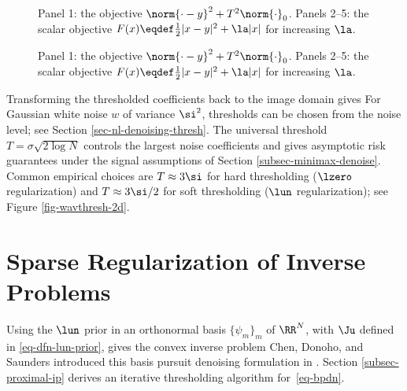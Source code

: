 \begin{figure}[tbp]
\centering
{}\hfill
{}
\caption{Panel 1: the objective $\norm{\cdot-y}^2+T^2 \norm{\cdot}_0$.
    Panels 2--5: the scalar objective $F(x) \eqdef \frac{1}{2}|x-y|^2+\la |x|$ for increasing $\la$.}
\label{fig-varspars}
\end{figure}
\begin{figure}[tbp]
\BookContinuedFigure
\centering
{}\hfill
{}\hfill
{}
\caption{Panel 1: the objective $\norm{\cdot-y}^2+T^2 \norm{\cdot}_0$.
    Panels 2--5: the scalar objective $F(x) \eqdef \frac{1}{2}|x-y|^2+\la |x|$ for increasing $\la$.}
\label{fig-varspars-continued}
\end{figure}




Transforming the thresholded coefficients back to the image domain gives
For Gaussian white noise $w$ of variance $\si^2$, thresholds can be chosen from the noise level; see Section \ref{sec-nl-denoising-thresh}. The universal threshold $T=\sigma\sqrt{2\log N}$ controls the largest noise coefficients and gives asymptotic risk guarantees under the signal assumptions of Section \ref{subsec-minimax-denoise}. Common empirical choices are $T \approx 3\si$ for hard thresholding ($\lzero$ regularization) and $T \approx 3\si/2$ for soft thresholding ($\lun$ regularization); see Figure \ref{fig-wavthresh-2d}.



                                                                                  


                                                                
                                                                
                                                                
\section{Sparse Regularization of Inverse Problems}
\label{sec-sparse-ip}

Using the $\lun$ prior in an orthonormal basis $\{\psi_m\}_m$ of $\RR^N$, with $\Ju$ defined in \eqref{eq-dfn-lun-prior}, gives the convex inverse problem
Chen, Donoho, and Saunders introduced this basis pursuit denoising formulation in \cite{chen-basis-pursuit}. Section \ref{subsec-proximal-ip} derives an iterative thresholding algorithm for~\eqref{eq-bpdn}.


